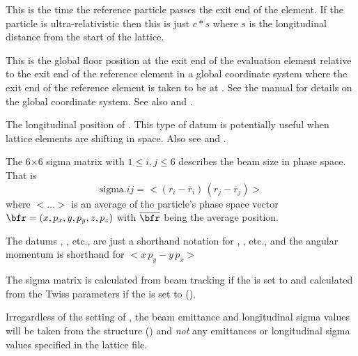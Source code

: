 \begin{description}
{{{{{{  %
  \item[ref_time] \Newline {}
This is the time the reference particle passes the exit end of the element.  If the particle is
ultra-relativistic then this is just $c * s$ where $s$ is the longitudinal distance from the start
of the lattice.

  \item[rel_floor.x, .y, .z, .theta] \Newline {}
This is the global floor position at the exit end of the evaluation element relative to the exit end
of the reference element in a global coordinate system where the exit end of the reference element
is taken to be at . See the \bmad manual for details on the global
coordinate system. See also  and .

  \item[s_position] \Newline {}
The longitudinal position of . This type of datum is potentially useful when lattice elements are shifting in space.
Also see  and .

  \item[sigma.x, .y, .z, .px, .py, .pz, .Lxy, .$ij$ \hspace{0.02in} $1 \le i,j \le 6$] \Newline {}
The 6$\times$6 sigma matrix  with $1 \le i,j \le 6$ describes the beam size in phase
space. That is
\begin{equation}
  \text{sigma.}ij = \big< (r_i - \overline r_i) \, (r_j - \overline r_j) \big>
\end{equation}
where $< \ldots >$ is an average of the particle's phase space vector $\bfr = (x, p_x, y, p_y, z, p_z)$ 
with $\overline{\mbox\bfr\raisebox{1.9mm}{}}$ being the average position. 

The datums , , etc., are just a shorthand notation for ,
, etc., and the angular momentum  is shorthand for $<x \, p_y - y \, p_x>$ 

The sigma matrix is calculated from beam tracking if the  is set to  and
calculated from the Twiss parameters if the  is set to  (). 

Irregardless of the setting of , the beam emittance and longitudinal sigma
values will be taken from the  structure () and {\em not}
any emittances or longitudinal sigma values specified in the lattice file.

}}}}}}
\end{description}
